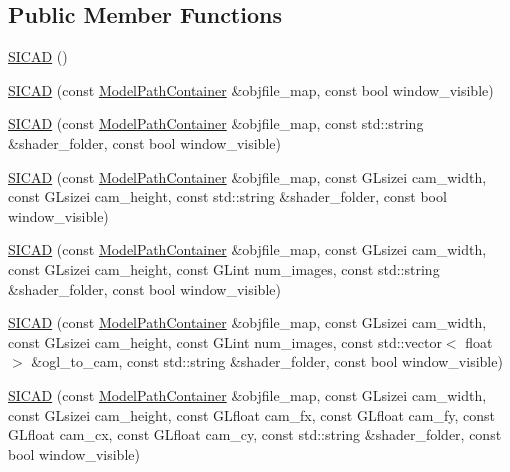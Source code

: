 \subsection*{Public Member Functions}
\begin{DoxyCompactItemize}
\item 
\mbox{\hyperlink{classSICAD_a6fe9d4a644f468438264842896684a2c}{S\+I\+C\+AD}} ()
\item 
\mbox{\hyperlink{classSICAD_af6f17b4221b2d2725de7663c1a990175}{S\+I\+C\+AD}} (const \mbox{\hyperlink{classSICAD_a9e1e1460d4c0f331b4fd015aae4dd721}{Model\+Path\+Container}} \&objfile\+\_\+map, const bool window\+\_\+visible)
\item 
\mbox{\hyperlink{classSICAD_aa3cd941a7aa5f6620c6591c3b21a081c}{S\+I\+C\+AD}} (const \mbox{\hyperlink{classSICAD_a9e1e1460d4c0f331b4fd015aae4dd721}{Model\+Path\+Container}} \&objfile\+\_\+map, const std\+::string \&shader\+\_\+folder, const bool window\+\_\+visible)
\item 
\mbox{\hyperlink{classSICAD_a2f0ac6e07e5b0cf7e8a99205bf4bc447}{S\+I\+C\+AD}} (const \mbox{\hyperlink{classSICAD_a9e1e1460d4c0f331b4fd015aae4dd721}{Model\+Path\+Container}} \&objfile\+\_\+map, const G\+Lsizei cam\+\_\+width, const G\+Lsizei cam\+\_\+height, const std\+::string \&shader\+\_\+folder, const bool window\+\_\+visible)
\item 
\mbox{\hyperlink{classSICAD_abebce8e8feb344ad23caed3e2a8b732a}{S\+I\+C\+AD}} (const \mbox{\hyperlink{classSICAD_a9e1e1460d4c0f331b4fd015aae4dd721}{Model\+Path\+Container}} \&objfile\+\_\+map, const G\+Lsizei cam\+\_\+width, const G\+Lsizei cam\+\_\+height, const G\+Lint num\+\_\+images, const std\+::string \&shader\+\_\+folder, const bool window\+\_\+visible)
\item 
\mbox{\hyperlink{classSICAD_abcb9bb154f73472447affb9bb16dcec7}{S\+I\+C\+AD}} (const \mbox{\hyperlink{classSICAD_a9e1e1460d4c0f331b4fd015aae4dd721}{Model\+Path\+Container}} \&objfile\+\_\+map, const G\+Lsizei cam\+\_\+width, const G\+Lsizei cam\+\_\+height, const G\+Lint num\+\_\+images, const std\+::vector$<$ float $>$ \&ogl\+\_\+to\+\_\+cam, const std\+::string \&shader\+\_\+folder, const bool window\+\_\+visible)
\item 
\mbox{\hyperlink{classSICAD_a6ddc65ccbfea740515782c4b0dc25a0c}{S\+I\+C\+AD}} (const \mbox{\hyperlink{classSICAD_a9e1e1460d4c0f331b4fd015aae4dd721}{Model\+Path\+Container}} \&objfile\+\_\+map, const G\+Lsizei cam\+\_\+width, const G\+Lsizei cam\+\_\+height, const G\+Lfloat cam\+\_\+fx, const G\+Lfloat cam\+\_\+fy, const G\+Lfloat cam\+\_\+cx, const G\+Lfloat cam\+\_\+cy, const std\+::string \&shader\+\_\+folder, const bool window\+\_\+visible)

\end{DoxyCompactItemize}
